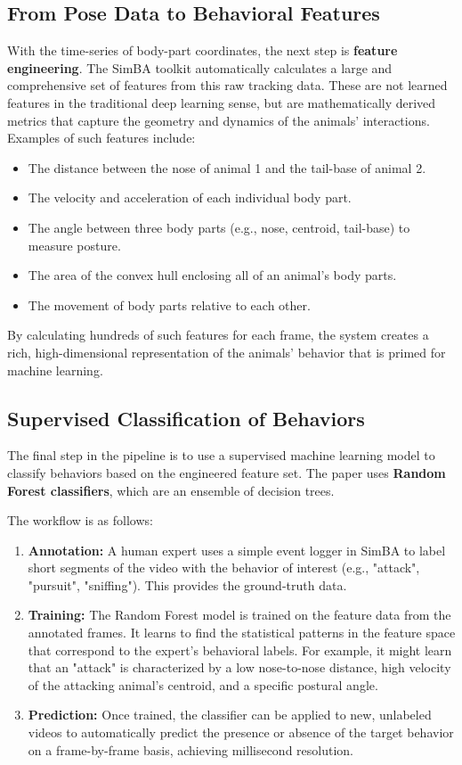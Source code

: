 \subsection{From Pose Data to Behavioral Features}

With the time-series of body-part coordinates, the next step is \textbf{feature engineering}. The SimBA toolkit automatically calculates a large and comprehensive set of features from this raw tracking data. These are not learned features in the traditional deep learning sense, but are mathematically derived metrics that capture the geometry and dynamics of the animals' interactions. Examples of such features include:

\begin{itemize}
    \item The distance between the nose of animal 1 and the tail-base of animal 2.
    \item The velocity and acceleration of each individual body part.
    \item The angle between three body parts (e.g., nose, centroid, tail-base) to measure posture.
    \item The area of the convex hull enclosing all of an animal's body parts.
    \item The movement of body parts relative to each other.
\end{itemize}
By calculating hundreds of such features for each frame, the system creates a rich, high-dimensional representation of the animals' behavior that is primed for machine learning.

\subsection{Supervised Classification of Behaviors}

The final step in the pipeline is to use a supervised machine learning model to classify behaviors based on the engineered feature set. The paper uses \textbf{Random Forest classifiers}, which are an ensemble of decision trees.

The workflow is as follows:
\begin{enumerate}
    \item \textbf{Annotation:} A human expert uses a simple event logger in SimBA to label short segments of the video with the behavior of interest (e.g., "attack", "pursuit", "sniffing"). This provides the ground-truth data.
    \item \textbf{Training:} The Random Forest model is trained on the feature data from the annotated frames. It learns to find the statistical patterns in the feature space that correspond to the expert's behavioral labels. For example, it might learn that an "attack" is characterized by a low nose-to-nose distance, high velocity of the attacking animal's centroid, and a specific postural angle.
    \item \textbf{Prediction:} Once trained, the classifier can be applied to new, unlabeled videos to automatically predict the presence or absence of the target behavior on a frame-by-frame basis, achieving millisecond resolution.
\end{enumerate}

